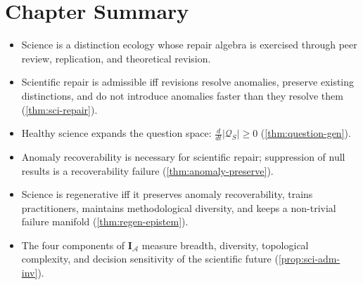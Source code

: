 \documentclass[12pt,twoside,openright]{book}
\newcommand{\adm}{\mathcal{A}}
\newenvironment{chapsummary}{%
  \begin{tcolorbox}[colback=DistBlue!5,colframe=DistBlue,
    title={\faBookOpen\enspace Summary},
    fonttitle=\sffamily\bfseries\color{white},
    attach boxed title to top left={yshift=-2mm,xshift=4mm},
    boxed title style={colback=DistBlue,rounded corners}]
  \begin{itemize}[nosep,leftmargin=*]}{%
  \end{itemize}\end{tcolorbox}}
\newcounter{exercise}[chapter]
\begin{document}
\section*{Chapter Summary}
\begin{chapsummary}
  \item Science is a distinction ecology whose repair
        algebra is exercised through peer review,
        replication, and theoretical revision.
  \item Scientific repair is admissible iff revisions
        resolve anomalies, preserve existing distinctions,
        and do not introduce anomalies faster than they
        resolve them (\cref{thm:sci-repair}).
  \item Healthy science expands the question space:
        $\frac{d}{dt}|\mathcal{Q}_S| \ge 0$
        (\cref{thm:question-gen}).
  \item Anomaly recoverability is necessary for
        scientific repair; suppression of null results
        is a recoverability failure
        (\cref{thm:anomaly-preserve}).
  \item Science is regenerative iff it preserves
        anomaly recoverability, trains practitioners,
        maintains methodological diversity, and
        keeps a non-trivial failure manifold
        (\cref{thm:regen-epistem}).
  \item The four components of $\mathbf{I}_\adm$
        measure breadth, diversity, topological
        complexity, and decision sensitivity of the
        scientific future (\cref{prop:sci-adm-inv}).
\end{chapsummary}
\end{document}
